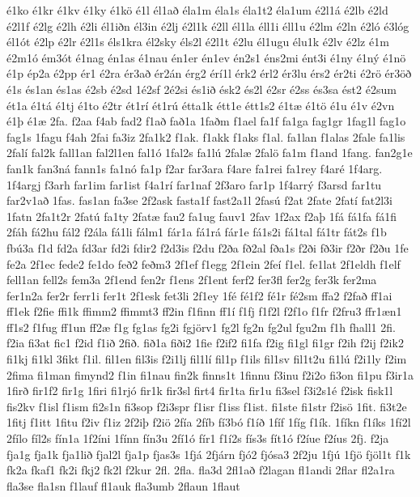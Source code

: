 {é1ko
é1kr
é1kv
é1ky
é1kö
é1l
él1að
éla1m
éla1s
éla1t2
éla1um
é2l1á
é2lb
é2ld
é2l1f
é2lg
é2lh
é2li
él1iðn
él3in
é2lj
é2l1k
é2ll
él1la
éll1i
éll1u
é2lm
é2ln
é2ló
é3lóg
él1ót
é2lp
é2lr
é2l1s
éls1kra
él2sky
éls2l
é2l1t
é2lu
él1ugu
élu1k
é2lv
é2lz
é1m
é2m1ó
ém3ót
é1nag
én1as
é1nau
én1er
én1ev
én2s1
éns2mi
ént3i
é1ny
é1ný
é1nö
é1p
ép2a
é2pp
ér1
é2ra
ér3að
ér2án
érg2
érí1l
érk2
érl2
ér3lu
érs2
ér2ti
é2rö
ér3öð
é1s
és1an
és1as
é2sb
é2sd
1é2sf
2é2si
és1ið
ésk2
és2l
é2sr
é2ss
és3sa
ést2
é2sum
ét1a
é1tá
é1tj
é1to
é2tr
ét1rí
ét1rú
étta1k
étt1e
étt1s2
é1tæ
é1tö
é1u
é1v
é2vn
é1þ
é1æ
2fa.
f2aa
f4ab
fad2
f1að
fað1a
1faðm
f1ael
fa1f
fa1ga
fag1gr
1fag1l
fag1o
fag1s
1fagu
f4ah
2fai
fa3iz
2fa1k2
f1ak.
f1akk
f1aks
f1al.
fa1lan
f1alas
2fale
fa1lis
2falí
fal2k
fall1an
fal2l1en
fal1ó
1fal2s
fa1lú
2falæ
2falö
fa1m
f1and
1fang.
fan2g1e
fan1k
fan3ná
fann1s
fa1nó
fa1p
f2ar
far3ara
f4are
fa1rei
fa1rey
f4aré
1f4arg.
1f4argj
f3arh
far1im
far1ist
f4a1rí
far1naf
2f3aro
far1p
1f4arrý
f3arsd
far1tu
far2v1að
1fas.
fas1an
fa3se
2f2ask
fasta1f
fast2a1l
2fasú
f2at
2fate
2fatí
fat2l3i
1fatn
2fa1t2r
2fatú
fa1ty
2fatæ
fau2
fa1ug
fauv1
2fav
1f2ax
f2aþ
1fá
fá1fa
fá1fi
2fáh
fá2hu
fál2
f2ála
fá1li
fálm1
fár1a
fá1rá
fár1e
fá1s2i
fá1tal
fá1tr
fát2s
f1b
fbú3a
f1d
fd2a
fd3ar
fd2i
fdir2
f2d3is
f2du
f2ða
fð2al
fða1s
f2ði
fð3ir
f2ðr
f2ðu
1fe
fe2a
2f1ec
fede2
fe1do
feð2
feðm3
2f1ef
f1egg
2f1ein
2feí
f1el.
fe1lat
2f1eldh
f1elf
fell1an
fell2s
fem3a
2f1end
fen2r
f1ens
2f1ent
ferf2
fer3fl
fer2g
fer3k
fer2ma
fer1n2a
fer2r
ferr1i
fer1t
2f1esk
fet3li
2f1ey
1fé
fé1f2
fé1r
fé2sm
ffa2
f2fað
ff1ai
ff1ek
f2fie
ffi1k
ffimm2
ffimmt3
ff2in
f1finn
ff1í
f1fj
f1f2l
f2f1o
f1fr
f2fru3
ffr1æn1
ff1s2
f1fug
ff1un
ff2æ
f1g
fg1as
fg2i
fgjörv1
fg2l
fg2n
fg2ul
fgu2m
f1h
fhall1
2fi.
f2ia
fi3at
fic1
f2id
f1ið
2fið.
fið1a
fiði2
1fie
f2if2
fi1fa
f2ig
fi1gl
fi1gr
f2ih
f2ij
f2ik2
fi1kj
fi1kl
3fikt
f1il.
fil1en
fil3is
f2i1lj
fil1lí
fil1p
f1ils
fil1sv
fil1t2u
fi1lú
f2i1ly
f2im
2fima
fi1man
fimynd2
f1in
fi1nau
fin2k
finns1t
1finnu
f3inu
f2i2o
fi3on
fi1pu
f3ir1a
1firð
fir1f2
fir1g
1firi
fi1rjó
fir1k
fir3sl
firt4
fir1ta
fir1u
fi3sel
f3i2s1é
f2isk
fisk1l
fis2kv
f1isl
f1ism
fi2s1n
fi3sop
f2i3spr
f1isr
f1iss
f1ist.
fi1ste
fi1str
f2isö
1fit.
fi3t2e
1fitj
f1itt
1fitu
f2iv
f1iz
2f2iþ
f2iö
2fía
2fíb
fí3bó
f1íð
1fíf
1fíg
f1ík.
1fíkn
f1íks
1fí2l
2fílo
fíl2s
fín1a
1f2íni
1fínn
fín3u
2fí1ó
fír1
f1í2s
fís3s
fít1ó
f2íue
f2íus
2fj.
f2ja
fja1g
fja1k
fja1lið
fjal2l
fja1p
fjas3s
1fjá
2fjárn
fjó2
fjósa3
2f2ju
1fjú
1fjö
fjöl1t
f1k
fk2a
fkaf1
fk2i
fkj2
fk2l
f2kur
2fl.
2fla.
fla3d
2fl1að
f2lagan
fl1andi
2flar
fl2a1ra
fla3se
fla1sn
f1lauf
fl1auk
fla3umb
2flaun
1flaut
}
